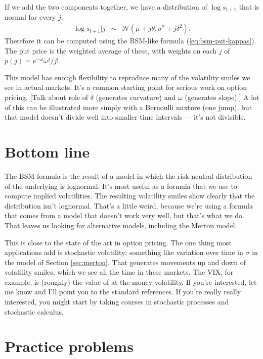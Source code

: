 \documentclass[11pt]{article}
\begin{document}
If we add the two components together, we have a distribution
of $\log s_{t+1}$ that is normal for every $j$:
\begin{eqnarray*}
    \log s_{t+1} | j &\sim& \mathcal{N}(\mu + j \theta, \sigma^2 + j \delta^2).
\end{eqnarray*}
Therefore it can be computed using the BSM-like formula (\ref{eq:bsm-put-kappas}).
The put price is the weighted average of these, with weights
on each $j$ of $p(j) = e^{-\omega} \omega^j / j!$.


This model has enough flexibility to reproduce many
of the volatility smiles we see in actual markets.
It's a common starting point for serious work on option pricing.
[Talk about role of $\delta$ (generates curvature)
and $\omega$ (generates slope).]
A lot of this can be illustrated more simply with a Bernoulli mixture (one jump),
but that model doesn't divide well into smaller time intervals ---
it's not divisible.


\section*{Bottom line}

The BSM formula is the result of a model in which the risk-neutral distribution
of the underlying is lognormal.
It's most useful as a formula that we use to compute implied volatilities.
The resulting volatility smiles show clearly that the distribution
isn't lognormal.
That's a little weird, because we're using a formula that comes from a model
that doesn't work very well, but that's what we do.
That leaves us looking for alternative models, including the Merton model.

This is close to the state of the art in option pricing.
The one thing most applications add is stochastic volatility:
something like variation over time in $\sigma$ in the model of
Section \ref{sec:merton}.
That generates movements up and down of volatility smiles,
which we see all the time in these markets.
The VIX, for example, is (roughly) the value of at-the-money volatility.
If you're interested, let me know and I'll point you to the standard references.
If you're really really interested, you might start by taking
courses in stochastic processes and stochastic calculus.


\section*{Practice problems}
\end{document}
